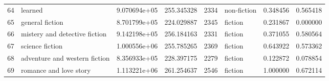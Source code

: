 \documentclass[11pt]{article}
\begin{document}
\begin{longtable}{llrrrlrr}
64 &                        learned &  9.070694e+05 &  255.345328 &  2334 &   non-fiction &    0.348456 &     0.565418 \\
65 &                general fiction &  8.701799e+05 &  224.029887 &  2345 &       fiction &    0.231867 &     0.000000 \\
66 &  mistery and detective fiction &  9.142198e+05 &  256.184163 &  2331 &       fiction &    0.371055 &     0.580564 \\
67 &                science fiction &  1.000556e+06 &  255.785265 &  2369 &       fiction &    0.643922 &     0.573362 \\
68 &  adventure and western fiction &  8.356933e+05 &  228.397175 &  2279 &       fiction &    0.122872 &     0.078854 \\
69 &         romance and love story &  1.113221e+06 &  261.254637 &  2546 &       fiction &    1.000000 &     0.672114 \\
\end{longtable}
\end{document}
